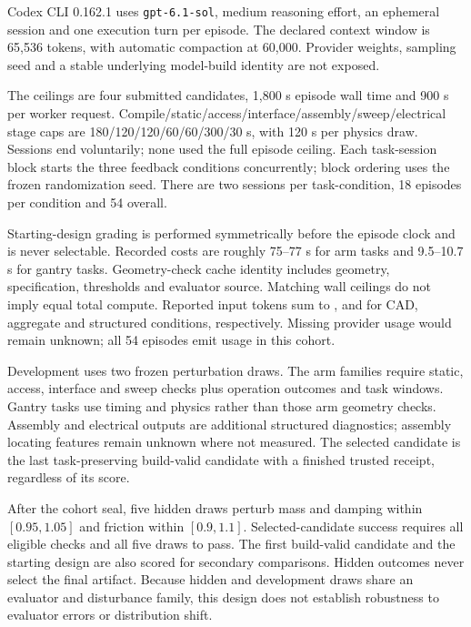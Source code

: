 Codex CLI 0.162.1 uses \texttt{gpt-6.1-sol}, medium reasoning effort, an ephemeral session and one execution turn per episode. The declared context window is 65,536 tokens, with automatic compaction at 60,000. Provider weights, sampling seed and a stable underlying model-build identity are not exposed.

The ceilings are four submitted candidates, 1,800 s episode wall time and 900 s per worker request. Compile/static/access/interface/assembly/sweep/electrical stage caps are 180/120/120/60/60/300/30 s, with 120 s per physics draw. Sessions end voluntarily; none used the full episode ceiling. Each task-session block starts the three feedback conditions concurrently; block ordering uses the frozen randomization seed. There are two sessions per task-condition, 18 episodes per condition and 54 overall.

Starting-design grading is performed symmetrically before the episode clock and is never selectable. Recorded costs are roughly 75--77 s for arm tasks and 9.5--10.7 s for gantry tasks. Geometry-check cache identity includes geometry, specification, thresholds and evaluator source. Matching wall ceilings do not imply equal total compute. Reported input tokens sum to \TokensCad{}, \TokensAggregate{} and \TokensStructured{} for CAD, aggregate and structured conditions, respectively. Missing provider usage would remain unknown; all 54 episodes emit usage in this cohort.

Development uses two frozen perturbation draws. The arm families require static, access, interface and sweep checks plus operation outcomes and task windows. Gantry tasks use timing and physics rather than those arm geometry checks. Assembly and electrical outputs are additional structured diagnostics; assembly locating features remain unknown where not measured. The selected candidate is the last task-preserving build-valid candidate with a finished trusted receipt, regardless of its score.

After the cohort seal, five hidden draws perturb mass and damping within $[0.95,1.05]$ and friction within $[0.9,1.1]$. Selected-candidate success requires all eligible checks and all five draws to pass. The first build-valid candidate and the starting design are also scored for secondary comparisons. Hidden outcomes never select the final artifact. Because hidden and development draws share an evaluator and disturbance family, this design does not establish robustness to evaluator errors or distribution shift.


